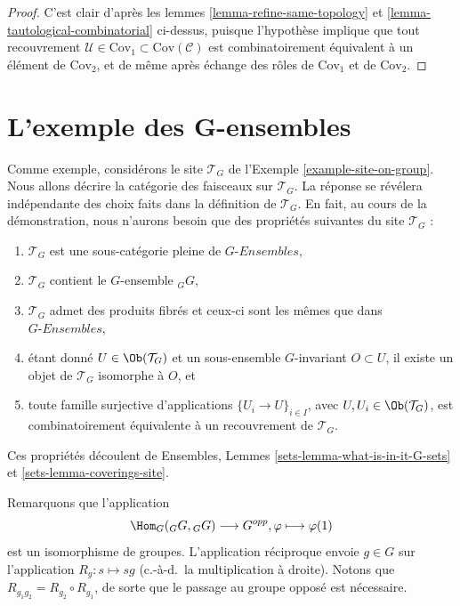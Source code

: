 \begin{proof}
C’est clair d’après les lemmes \ref{lemma-refine-same-topology} et
\ref{lemma-tautological-combinatorial} ci-dessus, puisque l’hypothèse implique
que tout recouvrement
$\mathcal{U} \in \text{Cov}_1 \subset \text{Cov}(\mathcal{C})$ est
combinatoirement équivalent à un élément de $\text{Cov}_2$, et de même après
échange des rôles de $\text{Cov}_1$ et de $\text{Cov}_2$.
\end{proof}












\section{L’exemple des G-ensembles}
\label{section-example-sheaf-G-sets}

\noindent
Comme exemple, considérons le site $\mathcal{T}_G$ de
l’Exemple \ref{example-site-on-group}. Nous allons décrire la
catégorie des faisceaux sur $\mathcal{T}_G$. La réponse se révélera
indépendante des choix faits dans la définition de $\mathcal{T}_G$.
En fait, au cours de la démonstration, nous n’aurons besoin que des
propriétés suivantes du site $\mathcal{T}_G$ :
\begin{enumerate}
\item[(a)] $\mathcal{T}_G$ est une sous-catégorie pleine de $G\textit{-Ensembles}$,
\item[(b)] $\mathcal{T}_G$ contient le $G$-ensemble ${}_GG$,
\item[(c)] $\mathcal{T}_G$ admet des produits fibrés et ceux-ci sont les mêmes que
dans $G\textit{-Ensembles}$,
\item[(d)] étant donné $U \in \Ob(\mathcal{T}_G)$ et un sous-ensemble
$G$-invariant $O \subset U$, il existe un objet de $\mathcal{T}_G$ isomorphe
à $O$, et
\item[(e)] toute famille surjective d’applications $\{U_i \to U\}_{i \in I}$, avec
$U, U_i \in \Ob(\mathcal{T}_G)$, est combinatoirement équivalente à un
recouvrement de $\mathcal{T}_G$.
\end{enumerate}
Ces propriétés découlent de Ensembles, Lemmes \ref{sets-lemma-what-is-in-it-G-sets}
et \ref{sets-lemma-coverings-site}.

\medskip\noindent
Remarquons que l’application
$$
\Hom_G({}_GG, {}_GG)
\longrightarrow
G^{opp},
\varphi
\longmapsto
\varphi(1)
$$
est un isomorphisme de groupes. L’application réciproque envoie $g \in G$
sur l’application $R_g : s \mapsto sg$ (c.-à-d.\ la multiplication à droite).
Notons que $R_{g_1g_2} = R_{g_2} \circ R_{g_1}$, de sorte que le passage au groupe
opposé est nécessaire.

